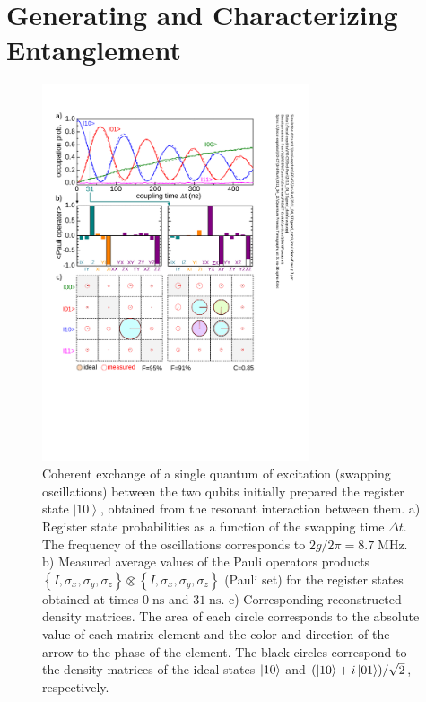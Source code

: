 \section{Generating and Characterizing Entanglement}

%
\begin{figure}
\centering \includegraphics[width=0.7\textwidth]{./material/papers/iswap/submission1/Dewes_Figure2}
\caption[Generating entangled two-qubit states by swapping interaction]{Coherent exchange of a single quantum of excitation
(swapping oscillations) between the two qubits initially prepared
the register state $\left|10\right\rangle $, obtained from the resonant
interaction between them. a) Register state probabilities
as a function of the swapping time $\Delta t$. The frequency of
the oscillations corresponds to $2g/2\pi=8.7\;\mathrm{MHz}$. b) Measured
average values of the Pauli operators products $\left\{ I,\sigma_{x},\sigma_{y},\sigma_{z}\right\} \otimes\left\{ I,\sigma_{x},\sigma_{y},\sigma_{z}\right\} $
(Pauli set) for the register states obtained at times $0\;\mathrm{ns}$
and $31\;\mathrm{ns}$. c) Corresponding reconstructed
density matrices. The area of each circle corresponds
to the absolute value of each matrix element and the color and direction
of the arrow to the phase of the element. The black circles correspond
to the density matrices of the ideal states $\left| 10 \right>$ and $(\left| 10 \right>+i\left| 01 \right>)/\sqrt{2}$,
respectively.}


\label{fig:swap_interaction_state_tomography} %
\end{figure}


